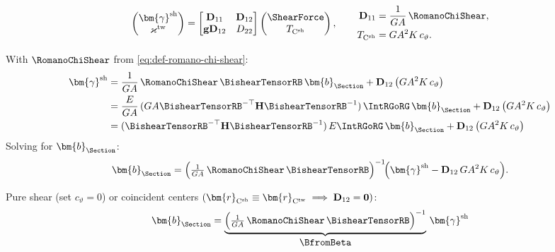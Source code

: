 
$$
\begin{pmatrix}
\bm{\gamma}^{\rm sh} \\
\varkappa^{\rm tw}
\end{pmatrix}
=\begin{bmatrix}
\mathbf{D}_{11} & \mathbf{D}_{12} \\
\mathbf g\mathbf{D}_{12} & D_{22}
\end{bmatrix}
\begin{pmatrix}
\ShearForce\\
T_{\mathrm C^{\rm sh}}
\end{pmatrix},
\qquad
\begin{aligned}
\mathbf{D}_{11}&=\frac{1}{GA}\,\RomanoChiShear,\\
T_{\mathrm C^{\rm sh}}&=GA^2K\,c_\vartheta.
\end{aligned}
$$

With \(\RomanoChiShear\) from \eqref{eq:def-romano-chi-shear}:
$$
\begin{aligned}
\bm{\gamma}^{\rm sh}
&=\frac{1}{GA}\,\RomanoChiShear\,\BishearTensorRB\,\bm{b}_{\Section}
+
\mathbf{D}_{12}\,\big(GA^2K\,c_\vartheta\big)\\
&=\frac{E}{GA}\, ( GA \BishearTensorRB^{-\top} \mathbf{H} \BishearTensorRB^{-1})\,\IntRGoRG\,\bm{b}_{\Section}
+
\mathbf{D}_{12}\,\big(GA^2K\,c_\vartheta\big)\\
&= (\BishearTensorRB^{-\top} \mathbf{H} \BishearTensorRB^{-1})\,E\IntRGoRG\,\bm{b}_{\Section}
+
\mathbf{D}_{12}\,\big(GA^2K\,c_\vartheta\big)\\
\end{aligned}
$$
Solving for $\bm{b}_{\Section}$:
\begin{equation}
\bm{b}_{\Section}
=\Big(\tfrac{1}{GA}\,\RomanoChiShear\,\BishearTensorRB\Big)^{-1}\!
\Big(\bm{\gamma}^{\rm sh}
- \mathbf{D}_{12}\,GA^2K \,c_\vartheta\Big).
\end{equation}

Pure shear (set $c_\vartheta=0$) or coincident centers $(\bm{r}_{\mathrm C^{\rm sh}}\equiv\bm{r}_{\mathrm C^{\rm tw}}\implies \mathbf{D}_{12}=\mathbf{0})$:
  $$
  \begin{aligned}
  \bm{b}_{\Section}
  &=\underbrace{\Big(\tfrac{1}{GA}\,\RomanoChiShear\,\BishearTensorRB\Big)^{-1}}_{\displaystyle \BfromBeta}
  \,\bm{\gamma}^{\rm sh}\\
  \end{aligned}
  $$



